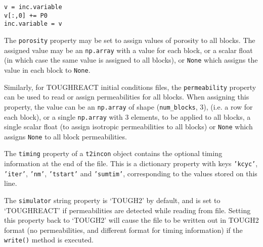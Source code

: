 \begin{lstlisting}
v = inc.variable
v[:,0] += P0
inc.variable = v
\end{lstlisting}

The \texttt{porosity} property may be set to assign values of porosity to all blocks.  The assigned value may be an \texttt{np.array} with a value for each block, or a scalar float (in which case the same value is assigned to all blocks), or \texttt{None} which assigns the value in each block to \texttt{None}.

Similarly, for TOUGHREACT initial conditions files, the \texttt{permeability} property can be used to read or assign permeabilities for all blocks.  When assigning this property, the value can be an \texttt{np.array} of shape (\texttt{num\_blocks}, 3), (i.e. a row for each block), or a single \texttt{np.array} with 3 elements, to be applied to all blocks, a single scalar float (to assign isotropic permeabilities to all blocks) or \texttt{None} which assigns \texttt{None} to all block permeabilities.

The \texttt{timing} property of a \texttt{t2incon} object contains the optional timing information at the end of the file.  This is a dictionary property with keys \texttt{'kcyc'}, \texttt{'iter'}, \texttt{'nm'}, \texttt{'tstart'} and \texttt{'sumtim'}, corresponding to the values stored on this line.

The \texttt{simulator} string property is `TOUGH2' by default, and is set to `TOUGHREACT' if permeabilities are detected while reading from file.  Setting this property back to `TOUGH2' will cause the file to be written out in TOUGH2 format (no permeabilities, and different format for timing information) if the \texttt{write()} method is executed.

